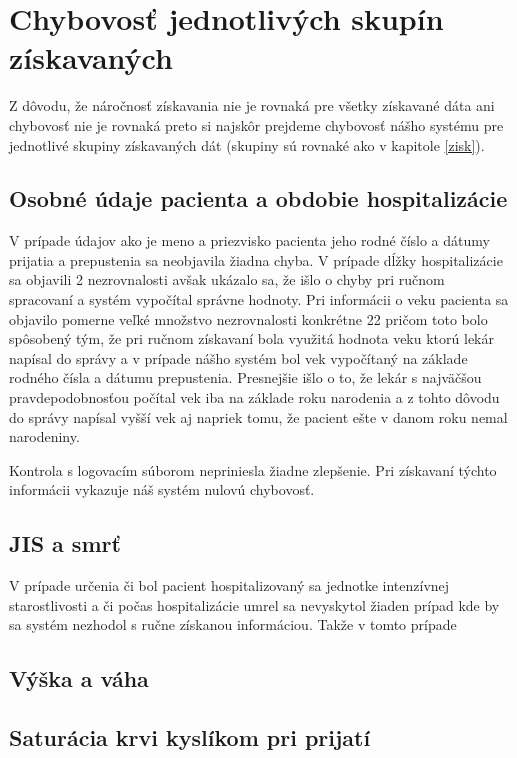 \section{Chybovosť jednotlivých skupín získavaných}

Z dôvodu, že náročnosť získavania nie je rovnaká pre všetky získavané dáta ani chybovosť nie je rovnaká preto si najskôr prejdeme chybovosť nášho systému pre jednotlivé skupiny získavaných dát (skupiny sú rovnaké ako v kapitole \ref{zisk}).

\subsection{Osobné údaje pacienta a obdobie hospitalizácie}

V prípade údajov ako je meno a priezvisko pacienta jeho rodné číslo a dátumy prijatia a prepustenia sa neobjavila žiadna chyba. V prípade dĺžky hospitalizácie sa objavili 2 nezrovnalosti avšak ukázalo sa, že išlo o chyby pri ručnom spracovaní a systém vypočítal správne hodnoty. Pri informácii o veku pacienta sa objavilo pomerne veľké množstvo nezrovnalosti konkrétne 22 pričom toto bolo spôsobený tým, že pri ručnom získavaní bola využitá hodnota veku ktorú lekár napísal do správy a v prípade nášho systém bol vek vypočítaný na základe rodného čísla a dátumu prepustenia. Presnejšie išlo o to, že lekár s najväčšou pravdepodobnosťou počítal vek iba na základe roku narodenia a z tohto dôvodu do správy napísal vyšší vek aj napriek tomu, že pacient ešte v danom roku nemal narodeniny.

Kontrola s logovacím súborom nepriniesla žiadne zlepšenie. Pri získavaní týchto informácii vykazuje náš systém nulovú chybovosť.

\subsection{JIS a smrť}

V prípade určenia či bol pacient hospitalizovaný sa jednotke intenzívnej starostlivosti a či počas hospitalizácie umrel sa nevyskytol žiaden prípad kde by sa systém nezhodol s ručne získanou informáciou. Takže v tomto prípade   

\subsection{Výška a váha}

\subsection{Saturácia krvi kyslíkom pri prijatí}

